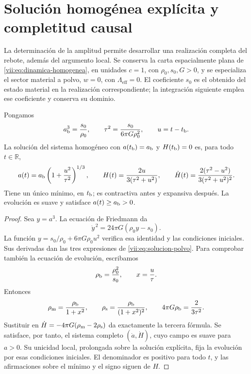 \section{Solución homogénea explícita y completitud causal}
\label{vii:sec:solucion-homogenea}
La determinación de la amplitud permite desarrollar una realización
completa del rebote, además del argumento local. Se conserva la carta
espacialmente plana de \eqref{vii:eq:dinamica-homogenea}, en unidades
\(c=1\), con \(\rho_0,s_0,G>0\), y se especializa el sector material
a polvo, \(w=0\), con \(\Lambda_{\mathrm{eff}}=0\).
El coeficiente \(s_0\) es el obtenido del estado
material en la realización correspondiente; la integración siguiente
emplea ese coeficiente y conserva su dominio.

\begin{theorem}
\label{vii:thm:rebote-polvo}
Pongamos
\[
 a_{\rm b}^3=\frac{s_0}{\rho_0},\qquad
 \tau^2=\frac{s_0}{6\pi G\rho_0^2},\qquad u=t-t_{\rm b}.
\]
La solución del sistema homogéneo con
\(a(t_{\rm b})=a_{\rm b}\) y \(H(t_{\rm b})=0\) es, para todo
\(t\in\mathbb R\),
\begin{equation}
 a(t)=a_{\rm b}\left(1+\frac{u^2}{\tau^2}\right)^{1/3},
 \qquad H(t)=\frac{2u}{3(\tau^2+u^2)},\qquad
 \dot H(t)=\frac{2(\tau^2-u^2)}{3(\tau^2+u^2)^2}.
 \label{vii:eq:solucion-polvo}
\end{equation}
Tiene un único mínimo, en \(t_{\rm b}\); es contractiva antes y
expansiva después. La evolución es suave y satisface
\(a(t)\geq a_{\rm b}>0\).
\end{theorem}
\begin{proof}
Sea \(y=a^3\). La ecuación de Friedmann da
\[
 \dot y^{\,2}=24\pi G(\rho_0y-s_0).
\]
La función \(y=s_0/\rho_0+6\pi G\rho_0u^2\) verifica esa
identidad y las condiciones iniciales. Sus derivadas dan las
tres expresiones de \eqref{vii:eq:solucion-polvo}. Para comprobar
también la ecuación de evolución, escribamos
\[
 \rho_{\rm b}=\frac{\rho_0^2}{s_0},\qquad
 x=\frac{u}{\tau}.
\]
Entonces
\[
 \rho_{\rm m}=\frac{\rho_{\rm b}}{1+x^2},\qquad
 \rho_{\rm s}=\frac{\rho_{\rm b}}{(1+x^2)^2},\qquad
 4\pi G\rho_{\rm b}=\frac{2}{3\tau^2}.
\]
Sustituir en \(\dot H=-4\pi G(\rho_{\rm m}-2\rho_{\rm s})\)
da exactamente la tercera fórmula. Se satisface, por tanto,
el sistema completo \((\dot a,\dot H)\), cuyo campo es suave
para \(a>0\). Su unicidad local, prolongada sobre la solución
explícita, fija la evolución por esas condiciones iniciales.
El denominador es positivo para todo \(t\), y las afirmaciones
sobre el mínimo y el signo siguen de \(H\).
\end{proof}

